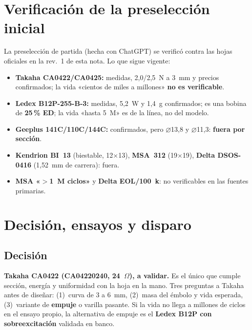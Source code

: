 \documentclass[11pt,a4paper]{article}
\begin{document}
\section{Verificación de la preselección inicial}
La preselección de partida (hecha con ChatGPT) se verificó contra las hojas oficiales en la rev.~1 de esta
nota. Lo que sigue vigente:
\begin{itemize}
  \item \textbf{Takaha CA0422/CA0425:} medidas, 2,0/2,5~N a 3~mm y precios confirmados; la vida «cientos de miles a
        millones» \textbf{no es verificable}.
  \item \textbf{Ledex B12P-255-B-3:} medidas, 5,2~W y 1,4~g confirmados; es una bobina de \textbf{25\,\% ED}; la vida
        «hasta 5~M» es de la línea, no del modelo.
  \item \textbf{Geeplus 141C/110C/144C:} confirmados, pero $\varnothing$13,8 y $\varnothing$11,3: \textbf{fuera por sección}.
  \item \textbf{Kendrion BI~13} (biestable, 12$\times$13), \textbf{MSA~312} (19$\times$19), \textbf{Delta DSOS-0416} (1,52~mm de
        carrera): fuera.
  \item \textbf{MSA «$>$1~M ciclos»} y \textbf{Delta EOL/100~k}: no verificables en las fuentes primarias.
\end{itemize}

\section{Decisión, ensayos y disparo}
\subsection{Decisión}
\textbf{Takaha CA0422 (CA04220240, 24~$\Omega$), a validar.} Es el único que cumple sección, energía y
uniformidad con la hoja en la mano. Tres preguntas a Takaha antes de diseñar: (1)~curva de 3 a 6~mm, (2)~masa
del émbolo y vida esperada, (3)~variante de \textbf{empuje} o varilla pasante. Si la vida no llega a millones de
ciclos en el ensayo propio, la alternativa de empuje es el \textbf{Ledex B12P con sobreexcitación} validada en banco.
\end{document}
